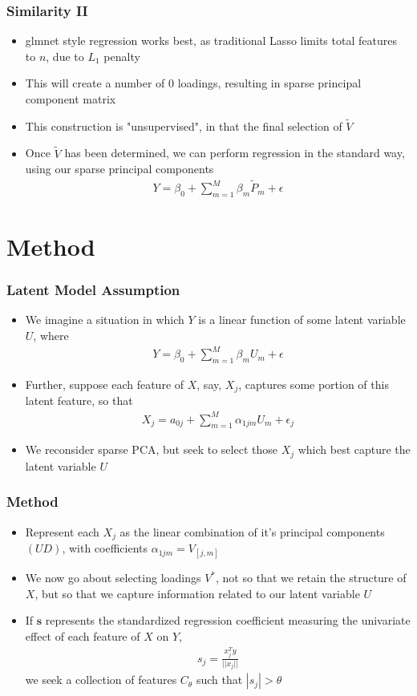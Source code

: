 \documentclass[11pt]{beamer}
\begin{document}
\begin{frame}
\frametitle{Similarity II}
{
\begin{itemize}
	\item glmnet style regression works best, as traditional Lasso limits total features to $n$, due to $L_1$ penalty
	\item This will create a number of $0$ loadings, resulting in sparse principal component  matrix
	\item This construction is "unsupervised", in that the final selection of $\tilde{V}$
	\item Once $\tilde{V}$ has been determined, we can perform regression in the standard way, using our sparse principal components
	\begin{align*}
	Y = \beta_0 + \sum_{m=1}^M \beta_m\tilde{P}_m  + \epsilon 
	\end{align*}
\end{itemize}
}
\end{frame}

\section{Method}
\begin{frame}
\frametitle{Latent Model Assumption}
{
\begin{itemize}
\item We imagine a situation in which $Y$ is a linear function of some latent variable $U$, where
\begin{align*}
Y = \beta_0 + \sum_{m = 1}^M \beta_m U_m + \epsilon
\end{align*}
\item Further, suppose each feature of $X$, say, $X_j$, captures some portion of this latent feature, so that
\begin{align*}
X_j = a_{0j} + \sum_{m=1}^M \alpha_{1jm} U_m + \epsilon_j
\end{align*}
\item We reconsider sparse PCA, but seek to select those $X_j$ which best capture the latent variable $U$
\end{itemize}
}
\end{frame}


\begin{frame}
\frametitle{Method}
{
\begin{itemize}
\item Represent each $X_j$ as the linear combination of it's principal components $(UD)$, with coefficients $\alpha_{1jm} = V_{[j,m]}$
\item We now go about selecting loadings $V^*$, not so that we retain the structure of $X$, but so that we capture information related to our latent variable $U$
\item If $\textbf{s}$ represents the standardized regression coefficient measuring the univariate effect of each feature of $X$ on $Y$,
\begin{align*}
s_j = \frac{x_j^Ty}{||x_j||}
\end{align*}
we seek a collection of features $C_{\theta}$ such that $|s_j| > \theta$
\end{itemize}
}
\end{frame}
\end{document}
